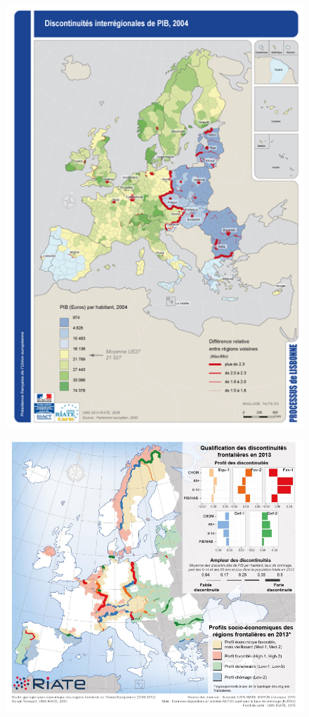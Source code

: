 \documentclass[]{book}
\begin{document}
\begin{figure}
\centering
\includegraphics{img/disc1.png}
\caption{}
\end{figure}

\begin{figure}
\centering
\includegraphics{img/disc2.png}
\caption{}
\end{figure}
\end{document}
